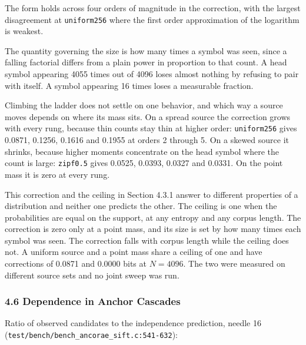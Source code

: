 The form holds across four orders of magnitude in the correction, with the largest disagreement at \texttt{uniform256} where the first order approximation of the logarithm is weakest.

The quantity governing the size is how many times a symbol was seen, since a falling factorial differs from a plain power in proportion to that count. A head symbol appearing 4055 times out of 4096 loses almost nothing by refusing to pair with itself. A symbol appearing 16 times loses a measurable fraction.

Climbing the ladder does not settle on one behavior, and which way a source moves depends on where its mass sits. On a spread source the correction grows with every rung, because thin counts stay thin at higher order: \texttt{uniform256} gives 0.0871, 0.1256, 0.1616 and 0.1955 at orders 2 through 5. On a skewed source it shrinks, because higher moments concentrate on the head symbol where the count is large: \texttt{zipf0.\allowbreak{}5} gives 0.0525, 0.0393, 0.0327 and 0.0331. On the point mass it is zero at every rung.

This correction and the ceiling in Section 4.3.1 answer to different properties of a distribution and neither one predicts the other. The ceiling is one when the probabilities are equal on the support, at any entropy and any corpus length. The correction is zero only at a point mass, and its size is set by how many times each symbol was seen. The correction falls with corpus length while the ceiling does not. A uniform source and a point mass share a ceiling of one and have corrections of 0.0871 and 0.0000 bits at \(N = 4096\). The two were measured on different source sets and no joint sweep was run.

\subsubsection{4.6 Dependence in Anchor Cascades}

Ratio of observed candidates to the independence prediction, needle 16 (\texttt{test/\allowbreak{}bench/\allowbreak{}bench\_\allowbreak{}ancorae\_\allowbreak{}sift.\allowbreak{}c:541-\allowbreak{}632}):

